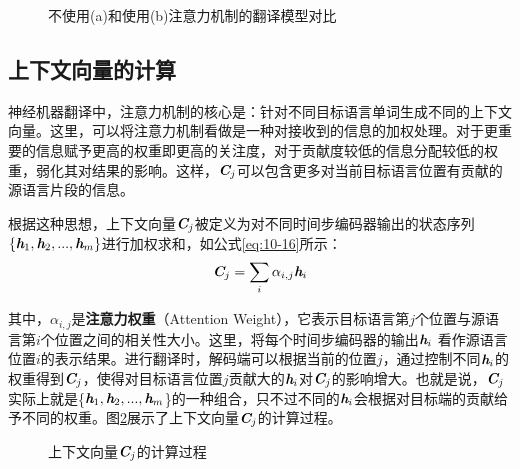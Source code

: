 \begin{figure}[htp]
\centering

\caption{不使用(a)和使用(b)注意力机制的翻译模型对比}
\label{fig:10-18}
\end{figure}

\subsection{上下文向量的计算}
\label{sec:10.1.3}

\parinterval 神经机器翻译中，注意力机制的核心是：针对不同目标语言单词生成不同的上下文向量。这里，可以将注意力机制看做是一种对接收到的信息的加权处理。对于更重要的信息赋予更高的权重即更高的关注度，对于贡献度较低的信息分配较低的权重，弱化其对结果的影响。这样，$\textbf{\em C}_j$可以包含更多对当前目标语言位置有贡献的源语言片段的信息。

\parinterval 根据这种思想，上下文向量$\textbf{\em C}_j$被定义为对不同时间步编码器输出的状态序列$\{ \textbf{\em h}_1, \textbf{\em h}_2,...,\textbf{\em h}_m \}$进行加权求和，如公式\eqref{eq:10-16}所示：
\begin{eqnarray}
\textbf{\em C}_j=\sum_{i} \alpha_{i,j} \textbf{\em h}_i
\label{eq:10-16}
\end{eqnarray}

\noindent 其中，$\alpha_{i,j}$是{\small\sffamily\bfseries{注意力权重}}（Attention Weight），它表示目标语言第$j$个位置与源语言第$i$个位置之间的相关性大小。这里，将每个时间步编码器的输出$\textbf{\em h}_i$ 看作源语言位置$i$的表示结果。进行翻译时，解码端可以根据当前的位置$j$，通过控制不同$\textbf{\em h}_i$的权重得到$\textbf{\em C}_j$，使得对目标语言位置$j$贡献大的$\textbf{\em h}_i$对$\textbf{\em C}_j$的影响增大。也就是说，$\textbf{\em C}_j$实际上就是\{${\textbf{\em h}_1, \textbf{\em h}_2,...,\textbf{\em h}_m}$\}的一种组合，只不过不同的$\textbf{\em h}_i$会根据对目标端的贡献给予不同的权重。图\ref{fig:10-19}展示了上下文向量$\textbf{\em C}_j$的计算过程。

\begin{figure}[htp]
\centering

\caption{上下文向量$\textbf{\em C}_j$的计算过程}
\label{fig:10-19}
\end{figure}

